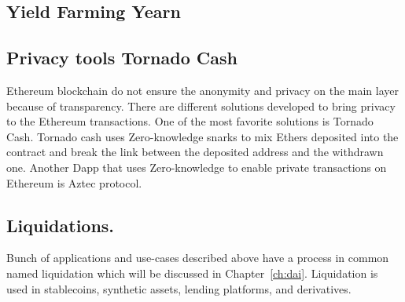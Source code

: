 \subsection{Yield Farming \eg Yearn}


\subsection{Privacy tools \eg Tornado Cash}
Ethereum blockchain do not ensure the anonymity and privacy on the main layer because of transparency. There are different solutions developed to bring privacy to the Ethereum transactions. One of the most favorite solutions is Tornado Cash. Tornado cash uses Zero-knowledge snarks to mix Ethers deposited into the contract and break the link between the deposited address and the withdrawn one. Another Dapp that uses Zero-knowledge to enable private transactions on Ethereum is Aztec protocol.




\subsection{Liquidations.} 
Bunch of applications and use-cases described above have a process in common named liquidation which will be discussed in Chapter~\ref{ch:dai}. Liquidation is used in stablecoins, synthetic assets, lending platforms, and derivatives.
